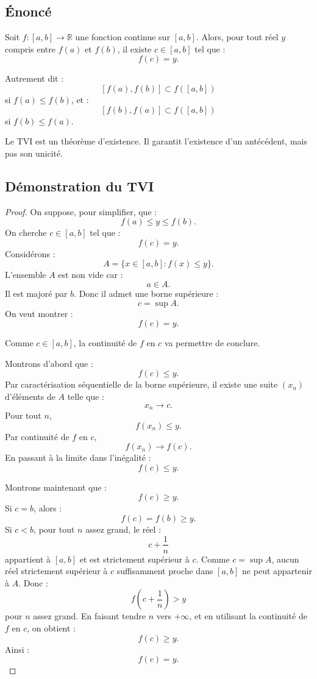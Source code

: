 \documentclass[11pt,a4paper]{article}
\newcommand{\R}{\mathbb R}
\begin{document}
\subsection{Énoncé}

\begin{theorembox}
Soit \(f:[a,b]\to\R\) une fonction continue sur \([a,b]\).  
Alors, pour tout réel \(y\) compris entre \(f(a)\) et \(f(b)\), il existe \(c\in[a,b]\) tel que :
\[
f(c)=y.
\]
\end{theorembox}

Autrement dit :
\[
[f(a),f(b)]\subset f([a,b])
\]
si \(f(a)\leq f(b)\), et :
\[
[f(b),f(a)]\subset f([a,b])
\]
si \(f(b)\leq f(a)\).

\begin{retenirbox}
Le TVI est un théorème d'existence.  
Il garantit l'existence d'un antécédent, mais pas son unicité.
\end{retenirbox}

\subsection{Démonstration du TVI}

\begin{proof}
On suppose, pour simplifier, que :
\[
f(a)\leq y\leq f(b).
\]
On cherche \(c\in[a,b]\) tel que :
\[
f(c)=y.
\]
Considérons :
\[
A=\{x\in[a,b]: f(x)\leq y\}.
\]
L'ensemble \(A\) est non vide car :
\[
a\in A.
\]
Il est majoré par \(b\).  
Donc il admet une borne supérieure :
\[
c=\sup A.
\]
On veut montrer :
\[
f(c)=y.
\]

Comme \(c\in[a,b]\), la continuité de \(f\) en \(c\) va permettre de conclure.  

Montrons d'abord que :
\[
f(c)\leq y.
\]
Par caractérisation séquentielle de la borne supérieure, il existe une suite \((x_n)\) d'éléments de \(A\) telle que :
\[
x_n\to c.
\]
Pour tout \(n\),
\[
f(x_n)\leq y.
\]
Par continuité de \(f\) en \(c\),
\[
f(x_n)\to f(c).
\]
En passant à la limite dans l'inégalité :
\[
f(c)\leq y.
\]

Montrons maintenant que :
\[
f(c)\geq y.
\]
Si \(c=b\), alors :
\[
f(c)=f(b)\geq y.
\]
Si \(c<b\), pour tout \(n\) assez grand, le réel :
\[
c+\frac1n
\]
appartient à \([a,b]\) et est strictement supérieur à \(c\).  
Comme \(c=\sup A\), aucun réel strictement supérieur à \(c\) suffisamment proche dans \([a,b]\) ne peut appartenir à \(A\).  
Donc :
\[
f\left(c+\frac1n\right)>y
\]
pour \(n\) assez grand.  
En faisant tendre \(n\) vers \(+\infty\), et en utilisant la continuité de \(f\) en \(c\), on obtient :
\[
f(c)\geq y.
\]
Ainsi :
\[
f(c)=y.
\]
\end{proof}
\end{document}
